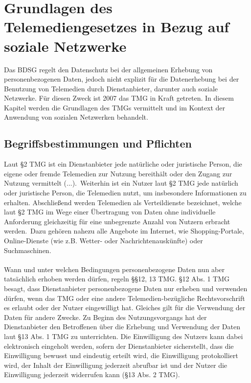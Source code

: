 \chapter{Grundlagen des Telemediengesetzes in Bezug auf soziale Netzwerke}
Das BDSG regelt den Datenschutz bei der allgemeinen Erhebung von personenbezogenen Daten, jedoch nicht explizit für die Datenerhebung bei der Benutzung von Telemedien durch Dienstanbieter, darunter auch soziale Netzwerke. Für diesen Zweck ist 2007 das \ac{TMG} in Kraft getreten.\autocite[vgl.][]{klicksafe.de} \autocite[vgl.][]{shr.de} In diesem Kapitel werden die Grundlagen des TMGs vermittelt und im Kontext der Anwendung von sozialen Netzwerken behandelt.
\section{Begriffsbestimmungen und Pflichten}
Laut \S 2 TMG ist ein Dienstanbieter \glqq jede natürliche oder juristische Person, die eigene oder fremde Telemedien zur Nutzung bereithält oder den Zugang zur Nutzung vermittelt (...).\grqq \ Weiterhin ist ein Nutzer laut \S 2 TMG jede natürlich oder juristische Person, die Telemedien nutzt, um insbesondere Informationen zu erhalten. Abschließend werden Telemedien als Verteildienste bezeichnet, welche laut \S 2 TMG \glqq im Wege einer Übertragung von Daten ohne individuelle Anforderung gleichzeitig für eine unbegrenzte Anzahl von Nutzern erbracht werden.\grqq \ Dazu gehören nahezu alle Angebote im Internet, wie Shopping-Portale, Online-Dienste (wie z.B. Wetter- oder Nachrichtenauskünfte) oder Suchmaschinen.\autocite[vgl.][]{shr.de}\\
\\Wann und unter welchen Bedingungen personenbezogene Daten nun aber tatsächlich erhoben werden dürfen, regeln \S\S 12, 13 TMG.  \S 12 Abs. 1 TMG besagt, dass Dienstanbieter personenbezogene Daten nur erheben und verwenden dürfen, wenn das TMG oder eine andere Telemedien-bezügliche Rechtsvorschrift es erlaubt oder der Nutzer eingewilligt hat. Gleiches gilt für die Verwendung der Daten für andere Zwecke. Zu Beginn des Nutzungsvorgangs hat der Dienstanbieter den Betroffenen über die Erhebung und Verwendung der Daten laut \S 13 Abs. 1 TMG zu unterrichten. Die Einwilligung des Nutzers kann dabei elektronisch eingeholt werden, sofern der Dienstanbieter sicherstellt, dass die Einwilligung bewusst und eindeutig erteilt wird, die Einwilligung protokolliert wird, der Inhalt der Einwilligung jederzeit abrufbar ist und der Nutzer die Einwilligung jederzeit widerrufen kann (\S 13 Abs. 2 TMG).
